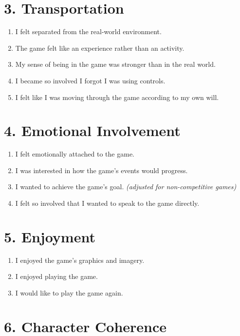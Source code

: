 \documentclass[12pt]{article}
\begin{document}
\section*{3. Transportation}

\begin{enumerate}[resume]
  \item I felt separated from the real-world environment.
  \item The game felt like an experience rather than an activity.
  \item My sense of being in the game was stronger than in the real world.
  \item I became so involved I forgot I was using controls.
  \item I felt like I was moving through the game according to my own will.
\end{enumerate}

\section*{4. Emotional Involvement}

\begin{enumerate}[resume]
  \item I felt emotionally attached to the game.
  \item I was interested in how the game’s events would progress.
  \item I wanted to achieve the game’s goal. \textit{(adjusted for non-competitive games)}
  \item I felt so involved that I wanted to speak to the game directly.
\end{enumerate}

\section*{5. Enjoyment}

\begin{enumerate}[resume]
  \item I enjoyed the game’s graphics and imagery.
  \item I enjoyed playing the game.
  \item I would like to play the game again.
\end{enumerate}

\section*{6. Character Coherence}
\end{document}
